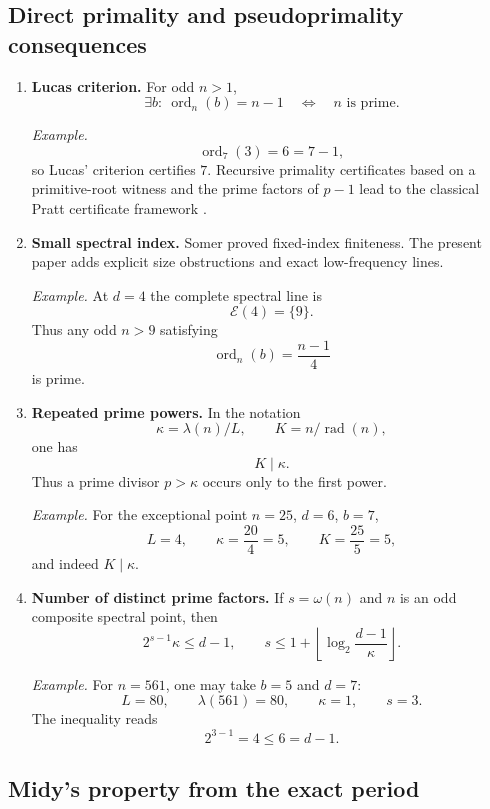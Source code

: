 \documentclass[11pt]{article}
\newcommand{\ord}{\operatorname{ord}}
\newcommand{\rad}{\operatorname{rad}}
\begin{document}
\subsection{Direct primality and pseudoprimality consequences}

\begin{enumerate}[label=\textbf{T\arabic*.},leftmargin=2.2em,resume]
\item \textbf{Lucas criterion.}
For odd $n>1$,
\[
\exists b:\ \ord_n(b)=n-1
\quad\Longleftrightarrow\quad
n\text{ is prime}.
\]

\smallskip
\noindent\emph{Example.}
\[
\ord_7(3)=6=7-1,
\]
so Lucas' criterion certifies $7$.  Recursive primality certificates based
on a primitive-root witness and the prime factors of $p-1$ lead to the
classical Pratt certificate framework \cite{Pratt1975}.

\item \textbf{Small spectral index.}
Somer proved fixed-index finiteness.  The present paper adds explicit size
obstructions and exact low-frequency lines.

\smallskip
\noindent\emph{Example.}
At $d=4$ the complete spectral line is
\[
\mathcal E(4)=\{9\}.
\]
Thus any odd $n>9$ satisfying
\[
\ord_n(b)=\frac{n-1}{4}
\]
is prime.

\item \textbf{Repeated prime powers.}
In the notation
\[
\kappa=\lambda(n)/L,
\qquad
K=n/\rad(n),
\]
one has
\[
K\mid\kappa.
\]
Thus a prime divisor $p>\kappa$ occurs only to the first power.

\smallskip
\noindent\emph{Example.}
For the exceptional point $n=25$, $d=6$, $b=7$,
\[
L=4,\qquad \kappa=\frac{20}{4}=5,\qquad
K=\frac{25}{5}=5,
\]
and indeed $K\mid\kappa$.

\item \textbf{Number of distinct prime factors.}
If $s=\omega(n)$ and $n$ is an odd composite spectral point, then
\[
2^{s-1}\kappa\le d-1,
\qquad
s\le1+\left\lfloor\log_2\frac{d-1}{\kappa}\right\rfloor.
\]

\smallskip
\noindent\emph{Example.}
For $n=561$, one may take $b=5$ and $d=7$:
\[
L=80,\qquad \lambda(561)=80,\qquad \kappa=1,\qquad s=3.
\]
The inequality reads
\[
2^{3-1}=4\le6=d-1.
\]
\end{enumerate}

\subsection{Midy's property from the exact period}
\end{document}
